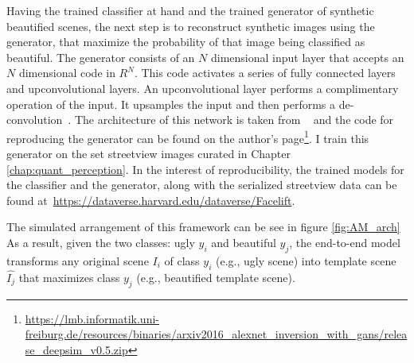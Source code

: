 Having the trained classifier at hand and the trained generator of synthetic beautified scenes, the next step is to reconstruct synthetic images using the generator, that maximize the probability of that image being classified as beautiful. The generator consists of an $N$ dimensional input layer that accepts an $N$ dimensional code in $R^N$. This code activates a series of fully connected layers and upconvolutional layers. An upconvolutional layer performs a complimentary operation of the input. It upsamples the input and then performs a de-convolution~\cite{dosovitskiy2015learning}. The architecture of this network is taken from ~\cite{dosovitskiy2016generating} and the code for reproducing the generator can be found on the author's page\footnote{ \url{https://lmb.informatik.uni-freiburg.de/resources/binaries/arxiv2016_alexnet_inversion_with_gans/release_deepsim_v0.5.zip}}. I train this generator on the set streetview images curated in Chapter \ref{chap:quant_perception}. In the interest of reproducibility, the trained models for the classifier and the generator, along with the serialized streetview data can be found at~\url{https://dataverse.harvard.edu/dataverse/Facelift}.

The simulated arrangement of this framework can be see in figure \ref{fig:AM_arch} 
As a result, given the two classes: ugly $y_i$ and beautiful $y_j$, the end-to-end model  transforms any original scene $I_i$ of class $y_i$ (e.g., ugly scene) into template scene $\hat{I_j}$ that maximizes class $y_j$ (e.g., beautified template scene). 

